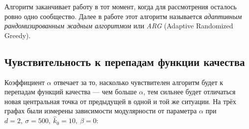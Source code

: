 Алгоритм заканчивает работу в тот момент, когда для рассмотрения осталось ровно одно сообщество. Далее в работе этот алгоритм называется \emph{адаптивным рандомизированным жадным алгоритмом} или \emph{ARG} (Adaptive Randomized Greedy).



\subsection{Чувствительность к перепадам функции качества}

Коэффициент $\alpha$ отвечает за то, насколько чувствителен алгоритм будет к перепадам функций качества --- чем больше $\alpha$, тем сильнее будет отличаться новая центральная точка от предыдущей в одной и той же ситуации. На трёх графах были измерены зависимости модулярности от параметра $\alpha$ при $d = 2,\ \sigma = 500,\ \hat{k}_0 = 10,\ \beta = 0$:

